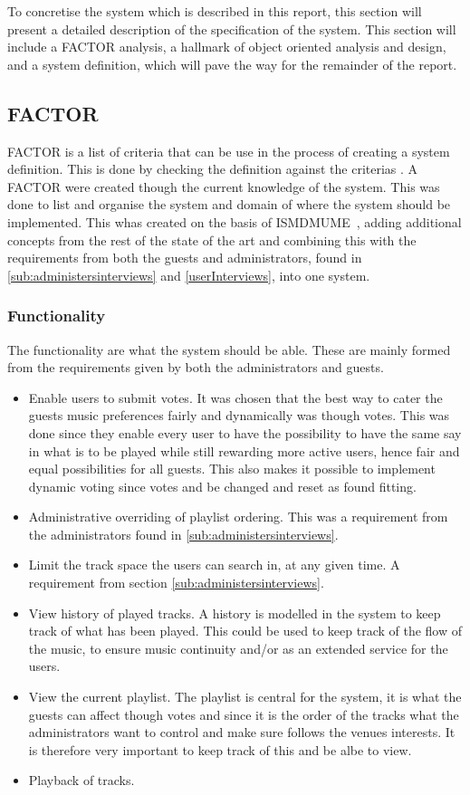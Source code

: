 To concretise the system which is described in this report, this section will present a detailed description of the specification of the system. This section will include a FACTOR analysis, a hallmark of object oriented analysis and design, and a system definition, which will pave the way for the remainder of the report.

\subsection{FACTOR}
FACTOR is a list of criteria that can be use in the process of creating a system definition. This is done by checking the definition against the criterias \cite{mathiassen2001objektorienteret}. A FACTOR were created though the current knowledge of the system. This was done to list and organise the system and domain of where the system should be implemented.
This whas created on the basis of ISMDMUME~\cite{sorensen2012}, adding additional concepts from the rest of the state of the art and combining this with the requirements from both the guests and administrators, found in \cref{sub:administersinterviews} and \cref{userInterviews}, into one system.
\subsubsection{Functionality}
The functionality are what the system should be able. These are mainly formed from the requirements given by both the administrators and guests.
\begin{itemize}
    \item Enable users to submit votes. It was chosen that the best way to cater the guests music preferences fairly and dynamically was though votes. This was done since they enable every user to have the possibility to have the same say in what is to be played while still rewarding more active users, hence fair and equal possibilities for all guests. This also makes it possible to implement dynamic voting since votes and be changed and reset as found fitting.
    \item Administrative overriding of playlist ordering. This was a requirement from the administrators found in \cref{sub:administersinterviews}.
    \item Limit the track space the users can search in, at any given time. A requirement from section \cref{sub:administersinterviews}.
    \item View history of played tracks. A history is modelled in the system to keep track of what has been played. This could be used to keep track of the flow of the music, to ensure music continuity and/or as an extended service for the users.
		\item View the current playlist. The playlist is central for the system, it is what the guests can affect though votes and since it is the order of the tracks what the administrators want to control and make sure follows the venues interests. It is therefore very important to keep track of this and be albe to view.
    \item Playback of tracks.
\end{itemize}

